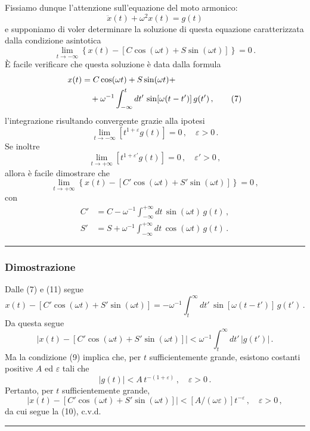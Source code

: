 \documentclass[11pt, a4paper]{book}
\numberwithin{equation}{section}
\begin{document}
Fissiamo dunque l'attenzione sull'equazione del moto armonico:
\begin{equation}
    \ddot{x}(t) + \omega^2 x(t) = g(t)
\end{equation}
e supponiamo di voler determinare la soluzione di questa equazione caratterizzata
dalla condizione asintotica
\begin{equation}
    \lim_{t \to -\infty} \left\{ x(t) - \left[ C \cos(\omega t) + S \sin(\omega t) \right] \right\} = 0 \,. \tag{6}
\end{equation}
È facile verificare che questa soluzione è data dalla formula
\begin{align}
    x(t) &= C \cos(\omega t) + S \sin(\omega t) + \notag \\
    &\quad + \omega^{-1} \int_{-\infty}^{t} dt' \, \sin[\omega(t-t')] \, g(t') \,, \tag{7}
\end{align}
l'integrazione risultando convergente grazie alla ipotesi
\begin{equation}
    \lim_{t \to -\infty} \left[ t^{1+\varepsilon} g(t) \right] = 0 \,, \quad \varepsilon > 0 \,. \tag{8}
\end{equation}
Se inoltre
\begin{equation}
    \lim_{t \to +\infty} \left[ t^{1+\varepsilon'} g(t) \right] = 0 \,, \quad \varepsilon' > 0 \,, \tag{9}
\end{equation}
allora è facile dimostrare che
\begin{equation}
    \lim_{t \to +\infty} \left\{ x(t) - \left[ C' \cos(\omega t) + S' \sin(\omega t) \right] \right\} = 0 \,, \tag{10}
\end{equation}
con
\begin{align}
    C' &= C - \omega^{-1} \int_{-\infty}^{+\infty} dt \, \sin(\omega t) \, g(t) \,, \tag{11a} \\
    S' &= S + \omega^{-1} \int_{-\infty}^{+\infty} dt \, \cos(\omega t) \, g(t) \,. \tag{11b}
\end{align}

\noindent\rule{\textwidth}{0.4pt}
\subsubsection*{Dimostrazione}

Dalle (7) e (11) segue
\[
    x(t) - \left[ C' \cos(\omega t) + S' \sin(\omega t) \right] = -\omega^{-1} \int_t^{\infty} dt' \, \sin[\omega(t-t')] \, g(t') \,.
\]
Da questa segue
\[
    \left| x(t) - \left[ C' \cos(\omega t) + S' \sin(\omega t) \right] \right| < \omega^{-1} \int_t^{\infty} dt' \, |g(t')| \,.
\]
Ma la condizione (9) implica che, per $t$ sufficientemente grande, esistono
costanti positive $A$ ed $\varepsilon$ tali che
\[
    |g(t)| < A \, t^{-(1+\varepsilon)} \,, \quad \varepsilon > 0 \,.
\]
Pertanto, per $t$ sufficientemente grande,
\[
    \left| x(t) - \left[ C' \cos(\omega t) + S' \sin(\omega t) \right] \right| < \left[ A/(\omega\varepsilon) \right] t^{-\varepsilon} \,, \quad \varepsilon > 0 \,,
\]
da cui segue la (10), c.v.d.
\noindent\rule{\textwidth}{0.4pt}
\end{document}
